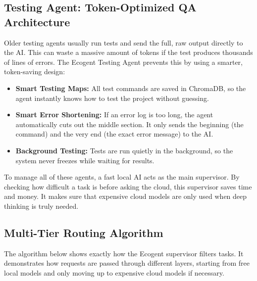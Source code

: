 \subsection{Testing Agent: Token-Optimized QA Architecture}
Older testing agents usually run tests and send the full, raw output directly to the AI. This can waste a massive amount of tokens if the test produces thousands of lines of errors. The Ecogent Testing Agent prevents this by using a smarter, token-saving design:
\begin{itemize}
    \item \textbf{Smart Testing Maps:} All test commands are saved in ChromaDB, so the agent instantly knows how to test the project without guessing.
    \item \textbf{Smart Error Shortening:} If an error log is too long, the agent automatically cuts out the middle section. It only sends the beginning (the command) and the very end (the exact error message) to the AI.
    \item \textbf{Background Testing:} Tests are run quietly in the background, so the system never freezes while waiting for results.
\end{itemize}

To manage all of these agents, a fast local AI acts as the main supervisor. By checking how difficult a task is before asking the cloud, this supervisor saves time and money. It makes sure that expensive cloud models are only used when deep thinking is truly needed.\\

\subsection{Multi-Tier Routing Algorithm}
The algorithm below shows exactly how the Ecogent supervisor filters tasks. It demonstrates how requests are passed through different layers, starting from free local models and only moving up to expensive cloud models if necessary.\\

